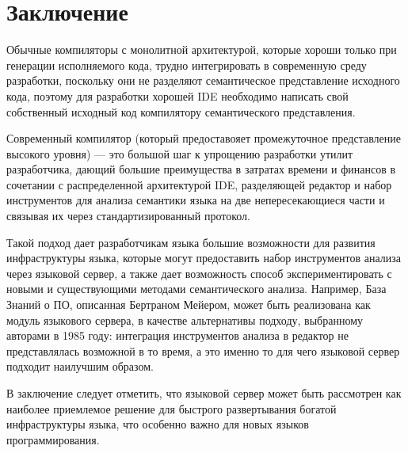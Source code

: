 \section{Заключение}
\label{sec:review_conclusion}
Обычные компиляторы с монолитной архитектурой, которые хороши только при генерации исполняемого кода, 
трудно интегрировать в современную среду разработки, поскольку они не разделяют семантическое представление исходного кода, 
поэтому для разработки хорошей IDE необходимо написать свой собственный исходный код компилятору семантического представления.

Современный компилятор (который предоставояет промежуточное представление высокого уровня) --- это большой шаг к упрощению разработки утилит разработчика, 
дающий большие преимущества в затратах времени и финансов в сочетании с распределенной архитектурой IDE, разделяющей редактор и набор инструментов для анализа семантики языка 
на две непересекающиеся части и связывая их через стандартизированный протокол.

Такой подход дает разработчикам языка большие возможности для развития инфраструктуры языка,
которые могут предоставить набор инструментов анализа через языковой сервер, 
а также дает возможность способ экспериментировать с новыми и существующими методами семантического анализа.
Например, База Знаний о ПО\cite{Wanghong}, описанная Бертраном Мейером, может быть реализована как модуль языкового сервера,
в качестве альтернативы подходу, выбранному авторами в 1985 году: интеграция инструментов анализа в редактор не представлялась возможной в то время, 
а это именно то для чего языковой сервер подходит наилучшим образом.

В заключение следует отметить, что языковой сервер может быть рассмотрен как наиболее приемлемое решение для быстрого развертывания богатой инфраструктуры языка,
что особенно важно для новых языков программирования.